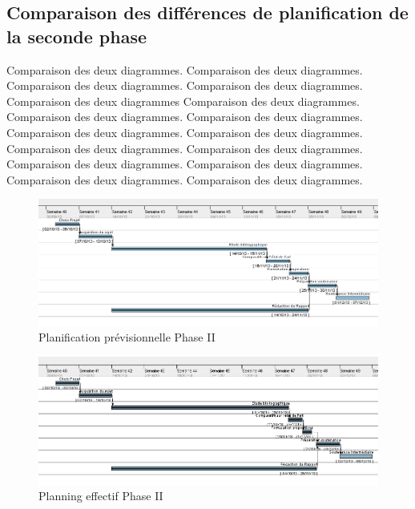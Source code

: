 \documentclass[11pt, french,screen]{report-rd-info}
\begin{document}
\subsection{Comparaison des différences de planification de la seconde phase}

Comparaison des deux diagrammes. Comparaison des deux diagrammes. Comparaison des deux diagrammes. Comparaison des deux diagrammes. Comparaison des deux diagrammes  Comparaison des deux diagrammes. Comparaison des deux diagrammes. Comparaison des deux diagrammes. Comparaison des deux diagrammes. Comparaison des deux diagrammes. Comparaison des deux diagrammes. Comparaison des deux diagrammes. Comparaison des deux diagrammes. Comparaison des deux diagrammes. Comparaison des deux diagrammes. Comparaison des deux diagrammes.



\begin{figure}
	\centering
		\includegraphics[width=1\textwidth]{Gantts/p2_previsionnel}
	\caption{Planification prévisionnelle Phase II}
	\label{fig:PlanningPrevisionnel2}
\end{figure}
\begin{figure}
	\centering
		\includegraphics[width=1\textwidth]{Gantts/p2_effectif}
	\caption{Planning effectif Phase II}
	\label{fig:PlanningEffectif2}
\end{figure}
\end{document}
